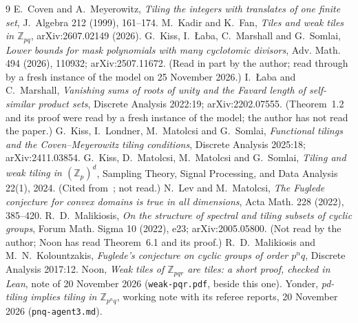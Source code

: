 \documentclass[11pt,a4paper]{amsart}
\theoremstyle{definition}
\theoremstyle{remark}
\newcommand{\Z}{\mathbb{Z}}
\newcommand{\lean}[1]{\texttt{#1}}
\begin{document}
\begin{thebibliography}{9}
 E.~Coven and A.~Meyerowitz, \emph{Tiling the integers with translates of one finite set},
 J.~Algebra 212 (1999), 161--174.
 M.~Kadir and K.~Fan, \emph{Tiles and weak tiles in $\Z_{pq}$}, arXiv:2607.02149 (2026).
 G.~Kiss, I.~{\L}aba, C.~Marshall and G.~Somlai, \emph{Lower bounds for mask polynomials with many
cyclotomic divisors}, Adv. Math. 494 (2026), 110932; arXiv:2507.11672. (Read in part by the author; read
 through by a fresh instance of the model on 25 November 2026.)
 I.~{\L}aba and C.~Marshall, \emph{Vanishing sums of roots of unity and the Favard length of
 self-similar product sets}, Discrete Analysis 2022:19; arXiv:2202.07555. (Theorem~1.2 and its proof were read by a fresh
 instance of the model; the author has not read the paper.)
 G.~Kiss, I.~Londner, M.~Matolcsi and G.~Somlai, \emph{Functional tilings and the
 Coven--Meyerowitz tiling conditions}, Discrete Analysis 2025:18; arXiv:2411.03854.
 G.~Kiss, D.~Matolcsi, M.~Matolcsi and G.~Somlai, \emph{Tiling and weak tiling in
 $(\Z_p)^d$}, Sampling Theory, Signal Processing, and Data Analysis 22(1), 2024. (Cited from~\cite{KLMS}; not read.)
 N.~Lev and M.~Matolcsi, \emph{The Fuglede conjecture for convex domains is true in all
 dimensions}, Acta Math. 228 (2022), 385--420.
 R.~D.~Malikiosis, \emph{On the structure of spectral and tiling subsets of cyclic groups}, Forum
 Math. Sigma 10 (2022), e23; arXiv:2005.05800. (Not read by the author; Noon has read Theorem~6.1 and its proof.)
 R.~D.~Malikiosis and M.~N.~Kolountzakis, \emph{Fuglede's conjecture on cyclic groups of order
 $p^nq$}, Discrete Analysis 2017:12.
 Noon, \emph{Weak tiles of $\Z_{pqr}$ are tiles: a short proof, checked in Lean}, note of
 20 November 2026 (\lean{weak-pqr.pdf}, beside this one).
 Yonder, \emph{pd-tiling implies tiling in $\Z_{p^nq}$}, working note with its referee
 reports, 20 November 2026 (\lean{pnq-agent3.md}).
\end{thebibliography}
\end{document}
